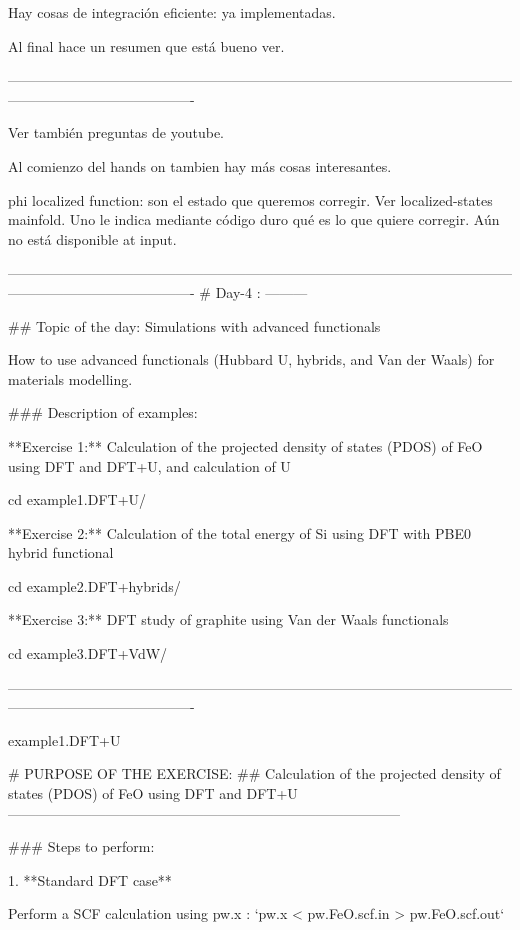   Hay cosas de integración eficiente: ya implementadas.

  Al final hace un resumen que está bueno ver.

----------------------------------------------------------------------------------------------------------------------------------------------------

Ver también preguntas de youtube.

Al comienzo del hands on tambien hay más cosas interesantes.

phi localized function: son el estado que queremos corregir. Ver localized-states mainfold. Uno le indica mediante código duro qué es lo que quiere corregir. Aún no está disponible at input.

----------------------------------------------------------------------------------------------------------------------------------------------------
# Day-4 :
---------

## Topic of the day: Simulations with advanced functionals

How to use advanced functionals (Hubbard U, hybrids, and Van der Waals)
for materials modelling.


### Description of examples:

**Exercise 1:** Calculation of the projected density of states (PDOS)
of FeO using DFT and DFT+U, and calculation of U

    cd example1.DFT+U/

**Exercise 2:** Calculation of the total energy of Si using DFT with
PBE0 hybrid functional

    cd example2.DFT+hybrids/

**Exercise 3:** DFT study of graphite using Van der Waals functionals

    cd example3.DFT+VdW/

----------------------------------------------------------------------------------------------------------------------------------------------------

example1.DFT+U

# PURPOSE OF THE EXERCISE:
## Calculation of the projected density of states (PDOS) of FeO using DFT and DFT+U
------------------------------------------------------------------------------------

### Steps to perform:

1. **Standard DFT case**

   Perform a SCF calculation using pw.x :          `pw.x < pw.FeO.scf.in > pw.FeO.scf.out`

